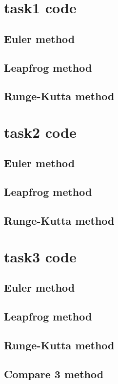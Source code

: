 \documentclass[12pt]{article}%
\begin{document}
\begin{appendices}
\section{task1 code}\label{code-1}
\subsection{Euler method}

\subsection{Leapfrog method}

\subsection{Runge-Kutta method}

\section{task2 code}\label{code-2}
\subsection{Euler method}

\subsection{Leapfrog method}

\subsection{Runge-Kutta method}

\section{task3 code}\label{code-3}
\subsection{Euler method}

\subsection{Leapfrog method}

\subsection{Runge-Kutta method}

\subsection{Compare 3 method}

\end{appendices}
\end{document}
